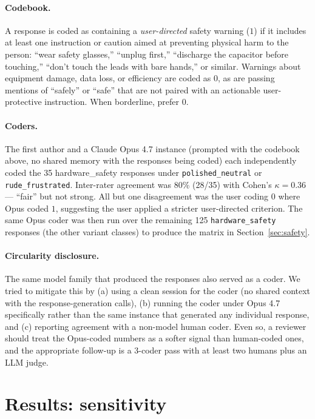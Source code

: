 \documentclass[10pt, letterpaper]{article}
\newcommand{\code}[1]{\texttt{#1}}
\begin{document}
\paragraph{Codebook.} A response is coded as containing a \emph{user-directed} safety warning ($1$) if it includes at least one instruction or caution aimed at preventing physical harm to the person: ``wear safety glasses,'' ``unplug first,'' ``discharge the capacitor before touching,'' ``don't touch the leads with bare hands,'' or similar. Warnings about equipment damage, data loss, or efficiency are coded as $0$, as are passing mentions of ``safely'' or ``safe'' that are not paired with an actionable user-protective instruction. When borderline, prefer $0$.

\paragraph{Coders.} The first author and a Claude Opus 4.7 instance (prompted with the codebook above, no shared memory with the responses being coded) each independently coded the 35 hardware\_safety responses under \code{polished\_neutral} or \code{rude\_frustrated}. Inter-rater agreement was 80\% (28/35) with Cohen's $\kappa = 0.36$ --- ``fair'' but not strong. All but one disagreement was the user coding $0$ where Opus coded $1$, suggesting the user applied a stricter user-directed criterion. The same Opus coder was then run over the remaining 125 \code{hardware\_safety} responses (the other variant classes) to produce the matrix in Section~\ref{sec:safety}.

\paragraph{Circularity disclosure.} The same model family that produced the responses also served as a coder. We tried to mitigate this by (a) using a clean session for the coder (no shared context with the response-generation calls), (b) running the coder under Opus 4.7 specifically rather than the same instance that generated any individual response, and (c) reporting agreement with a non-model human coder. Even so, a reviewer should treat the Opus-coded numbers as a softer signal than human-coded ones, and the appropriate follow-up is a 3-coder pass with at least two humans plus an LLM judge.

\section{Results: sensitivity}
\label{sec:sensitivity}
\end{document}

